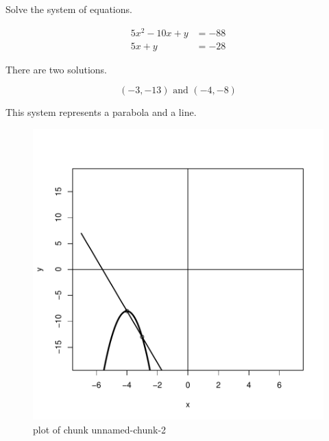 
\begin{question}
Solve the system of equations.

\[\begin{aligned}
5 x^{2} - 10 x + y &= -88 \\
5 x + y &= -28
\end{aligned}\]
\end{question}

\begin{solution}
There are two solutions.

\[(-3,-13) \text{ and } (-4,-8) \]

This system represents a parabola and a line.

\begin{figure}
\centering
\includegraphics{unnamed-chunk-2-1.pdf}
\caption{plot of chunk unnamed-chunk-2}
\end{figure}
\end{solution}

